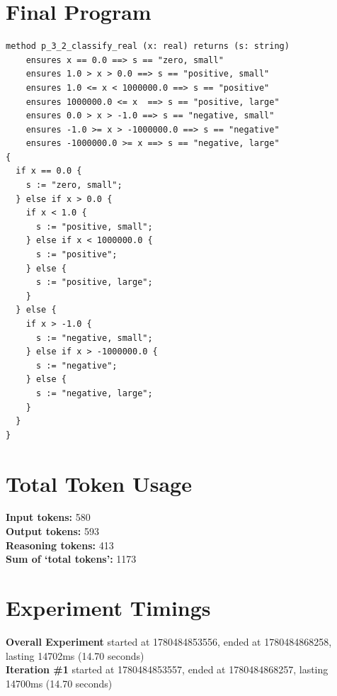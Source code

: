 \documentclass{article}
\begin{document}
\section*{Final Program}
\begin{lstlisting}
method p_3_2_classify_real (x: real) returns (s: string)
	ensures x == 0.0 ==> s == "zero, small"
	ensures 1.0 > x > 0.0 ==> s == "positive, small"
	ensures 1.0 <= x < 1000000.0 ==> s == "positive"
	ensures 1000000.0 <= x  ==> s == "positive, large"
	ensures 0.0 > x > -1.0 ==> s == "negative, small"
	ensures -1.0 >= x > -1000000.0 ==> s == "negative"
	ensures -1000000.0 >= x ==> s == "negative, large"
{
  if x == 0.0 {
    s := "zero, small";
  } else if x > 0.0 {
    if x < 1.0 {
      s := "positive, small";
    } else if x < 1000000.0 {
      s := "positive";
    } else {
      s := "positive, large";
    }
  } else {
    if x > -1.0 {
      s := "negative, small";
    } else if x > -1000000.0 {
      s := "negative";
    } else {
      s := "negative, large";
    }
  }
}
\end{lstlisting}
\section*{Total Token Usage}
\textbf{Input tokens: }580
\\\textbf{Output tokens: }593
\\\textbf{Reasoning tokens: }413
\\\textbf{Sum of `total tokens': }1173
\section*{Experiment Timings}
\textbf{Overall Experiment} started at 1780484853556, ended at 1780484868258, lasting 14702ms (14.70 seconds)
\\\textbf{Iteration \#1} started at 1780484853557, ended at 1780484868257, lasting 14700ms (14.70 seconds)
\end{document}
